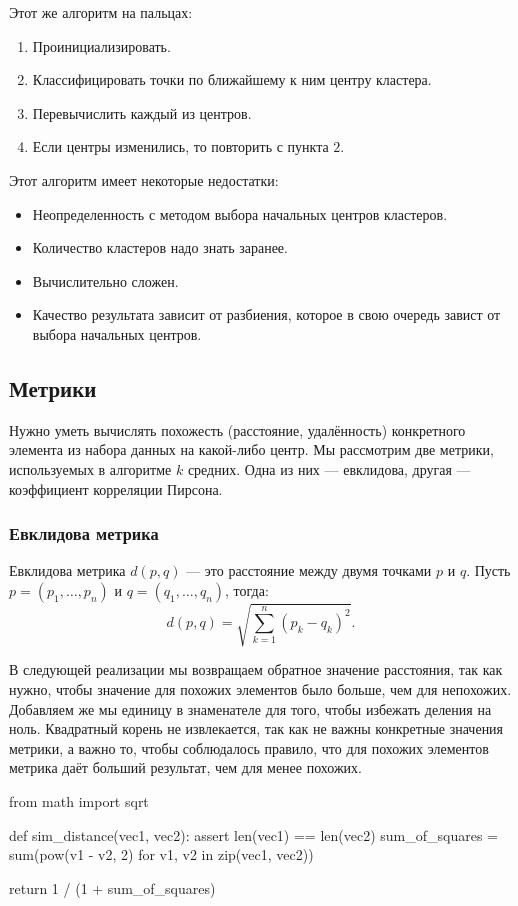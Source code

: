 Этот же алгоритм на пальцах:
\begin{enumerate}
  \item Проинициализировать.
  \item Классифицировать точки по ближайшему к ним центру кластера.
  \item Перевычислить каждый из центров.
  \item Если центры изменились, то повторить с пункта $2$.
\end{enumerate}

Этот алгоритм имеет некоторые недостатки:
\begin{itemize}
  \item Неопределенность с методом выбора начальных центров кластеров.
  \item Количество кластеров надо знать заранее.
  \item Вычислительно сложен.
  \item Качество результата зависит от разбиения, которое в свою очередь завист от выбора начальных центров.
\end{itemize}

\subsection{Метрики}
Нужно уметь вычислять похожесть (расстояние, удалённость) конкретного элемента из набора данных на какой-либо центр. Мы рассмотрим две метрики, используемых в алгоритме $k$ средних. Одна из них — евклидова, другая — коэффициент корреляции Пирсона.

\subsubsection{Евклидова метрика}
Евклидова метрика $d(p, q)$ — это расстояние между двумя точками $p$ и $q$. Пусть $p = (p_1, \dots, p_n)$ и $q = (q_1, \dots, q_n)$, тогда:
\[
d(p, q) = \sqrt{\sum_{k = 1}^n (p_k - q_k)^2}.
\]

В следующей реализации мы возвращаем обратное значение расстояния, так как нужно, чтобы значение для похожих элементов было больше, чем для непохожих. Добавляем же мы единицу в знаменателе для того, чтобы избежать деления на ноль. Квадратный корень не извлекается, так как не важны конкретные значения метрики, а важно то, чтобы соблюдалось правило, что для похожих элементов метрика даёт больший результат, чем для менее похожих.
\begin{pylst}{}{}
from math import sqrt

def sim_distance(vec1, vec2):
    assert len(vec1) == len(vec2)
    sum_of_squares = sum(pow(v1 - v2, 2)
                         for v1, v2 in zip(vec1, vec2))

    return 1 / (1 + sum_of_squares)
\end{pylst}

